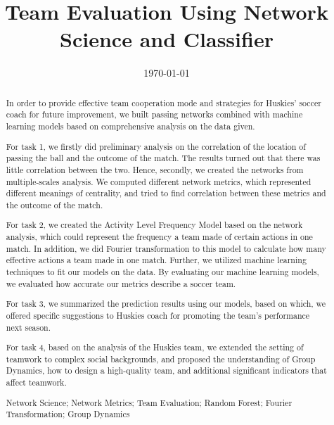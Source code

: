\documentclass{mcmthesis}
\title{Team Evaluation Using Network Science and Classifier}
\date{\today}
\begin{document}
    \begin{abstract}

		In order to provide effective team cooperation mode and strategies for Huskies’ soccer coach for future improvement, we built passing networks combined with machine learning models based on comprehensive analysis on the data given.
		
		For task 1, we firstly did preliminary analysis on the correlation of the location of passing the ball and the outcome of the match. The results turned out that there was little correlation between the two. Hence, secondly, we created the networks from multiple-scales analysis. We computed different network metrics, which represented different meanings of centrality, and tried to find correlation between these metrics and the outcome of the match. 
		
		For task 2, we created the Activity Level Frequency Model based on the network analysis, which could represent the frequency a team made of certain actions in one match. In addition, we did Fourier transformation to this model to calculate how many effective actions a team made in one match. Further, we utilized machine learning techniques to fit our models on the data. By evaluating our machine learning models, we evaluated how accurate our metrics describe a soccer team.
		
		For task 3, we summarized the prediction results using our models, based on which, we offered specific suggestions to Huskies coach for promoting the team's performance next season.
		
		For task 4, based on the analysis of the Huskies team, we extended the setting of teamwork to complex social backgrounds, and proposed the understanding of Group Dynamics, how to design a high-quality team, and additional significant indicators that affect teamwork.


\begin{keywords}
Network Science; Network Metrics; Team Evaluation; Random Forest; Fourier Transformation; Group Dynamics
\end{keywords}
\end{abstract}
\maketitle
\tableofcontents
\setlength{\parindent}{2em}
\end{document}
